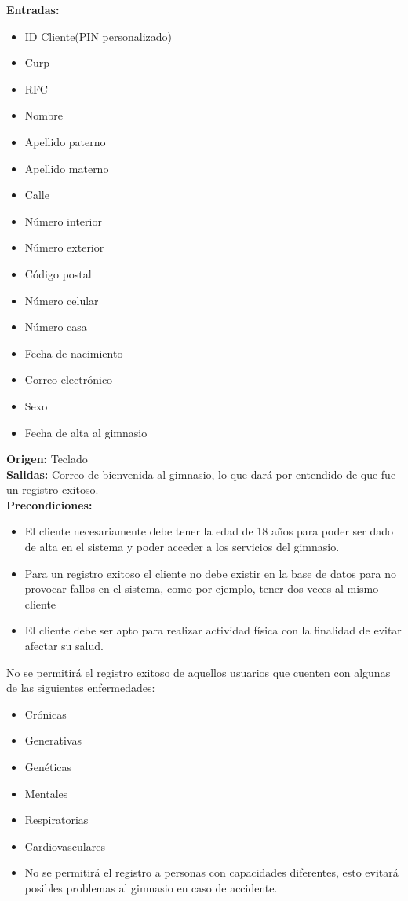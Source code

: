 \textbf{Entradas:}
\begin{itemize}
	\item ID Cliente(PIN personalizado)
	\item Curp
	\item RFC
	\item Nombre
	\item Apellido paterno
	\item Apellido materno
	\item Calle
	\item Número interior
	\item Número exterior
	\item Código postal
	\item Número celular
	\item Número casa
	\item Fecha de nacimiento
	\item Correo electrónico
	\item Sexo
	\item Fecha de alta al gimnasio
\end{itemize}
\textbf{Origen:} Teclado\\
\textbf{Salidas:} Correo de bienvenida al gimnasio, lo que dará por entendido de que fue un registro exitoso.\\
\textbf{Precondiciones:}
\begin{itemize}
	\item El cliente necesariamente debe tener la edad de 18 años para poder ser dado de alta en el sistema y poder acceder a los servicios del gimnasio.
	\item Para un registro exitoso el cliente no debe existir en la base de datos para no provocar fallos en el sistema, como por ejemplo, tener dos veces al mismo cliente
	\item El cliente debe ser apto para realizar actividad física con la finalidad de evitar  afectar su salud.
\end{itemize}
No se permitirá el registro exitoso de aquellos usuarios que cuenten con algunas de  las siguientes enfermedades: \\
\begin{itemize}
	\item Crónicas
	\item Generativas
	\item Genéticas
	\item Mentales
	\item Respiratorias
	\item Cardiovasculares
	\item No se permitirá el registro a personas con capacidades diferentes, esto evitará posibles problemas al gimnasio en caso de accidente.
\end{itemize}
	
